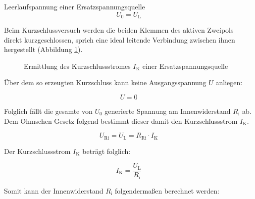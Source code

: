 \begin{frame}
{		\begin{Merksatz}{Leerlaufspannung einer Ersatzspannungsquelle}{}
			\begin{equation*}
				U_0 = U_\mathrm{L}
			\end{equation*}
		\end{Merksatz}

		Beim Kurzschlussversuch werden die beiden Klemmen des aktiven Zweipols direkt kurzgeschlossen, sprich eine
		ideal leitende Verbindung zwischen ihnen hergestellt (Abbildung \ref{fig:kurzschluss1}).


		\begin{figure}[ht]
			\begin{center}

			\end{center}
			\caption{Ermittlung des Kurzschlussstromes $I_\mathrm{K}$ einer Ersatzspannungsquelle}
			\label{fig:kurzschluss1}


		\end{figure}

		Über dem so erzeugten Kurzschluss kann keine Ausgangsspannung $U$ anliegen:

		\begin{equation*}
			U = 0
		\end{equation*}

		Folglich fällt die gesamte von $U_0$ generierte Spannung am Innenwiderstand $R_\mathrm{i}$ ab.
		Dem Ohmschen Gesetz folgend bestimmt dieser damit den Kurzschlussstrom $I_\mathrm{K}$.

		\begin{equation*}
			U_\mathrm{Ri} = U_\mathrm{L} =R_\mathrm{Ri} \cdot I_\mathrm{K}
		\end{equation*}

		Der Kurzschlussstrom $I_\mathrm{K}$ beträgt folglich:




		\begin{equation*}
			I_\mathrm{K} = \frac{U_\mathrm{L}}{R_\mathrm{i}}
		\end{equation*}

		Somit kann der Innenwiderstand $R_\mathrm{i}$ folgendermaßen berechnet werden:

}
\end{frame}
